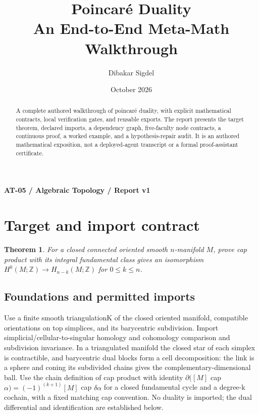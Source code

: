 \documentclass[preprint,12pt,aps,pra,showkeys,amsmath,amssymb,superscriptaddress,floatfix]{revtex4-2}
\newtheorem{theorem}{Theorem}[section]
\theoremstyle{definition}
\theoremstyle{remark}
\begin{document}
\title{Poincaré Duality\\[4pt]\large An End-to-End Meta-Math Walkthrough}

\author{Dibakar Sigdel}


\date{October 2026}

\begin{abstract}

A complete authored walkthrough of poincaré duality, with explicit
mathematical contracts, local verification gates, and reusable exports.
The report presents the target theorem, declared imports, a dependency
graph, five-faculty node contracts, a continuous proof, a worked
example, and a hypothesis-repair audit. It is an authored mathematical
exposition, not a deployed-agent transcript or a formal proof-assistant
certificate.

\end{abstract}\maketitle\linespread{1.12}\selectfont

\noindent\textbf{AT-05 / Algebraic Topology / Report v1}

\section{Target and import contract}

\begin{theorem}

For a closed connected oriented smooth \(n\)-manifold \(M\), prove cap
product with its integral fundamental class gives an isomorphism
\(H^k(M;\mathbb Z)\to H_{n-k}(M;\mathbb Z)\) for \(0\le k\le n\).

\end{theorem}

\subsection{Foundations and permitted imports}

Use a finite smooth triangulationK of the closed oriented manifold,
compatible orientations on top simplices, and its barycentric
subdivision. Import simplicial/cellular-to-singular homology and
cohomology comparison and subdivision invariance. In a triangulated
manifold the closed star of each simplex is contractible, and
barycentric dual blocks form a cell decomposition: the link is a sphere
and coning its subdivided chains gives the complementary-dimensional
ball. Use the chain definition of cap product with identity
\(\partial ([M]\) cap \(\alpha )=(-1)^{(k+1)}[M]\) cap \(\delta \alpha\)
for a closed fundamental cycle and a degree-k cochain, with a fixed
matching cap convention. No duality is imported; the dual differential
and identification are established below.
\end{document}
